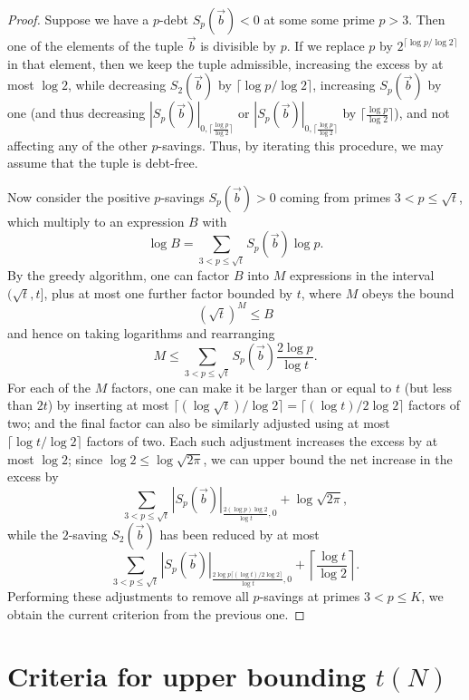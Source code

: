 \documentclass[12pt,a4paper,reqno]{amsart}
\numberwithin{equation}{section}
\theoremstyle{plain}
\theoremstyle{definition}
\begin{document}
\begin{proof} Suppose we have a $p$-debt $S_p(\vec b) < 0$ at some some prime $p>3$.  Then one of the elements of the tuple $\vec b$ is divisible by $p$.  If we replace $p$ by $2^{\lceil \log p/\log 2 \rceil}$ in that element, then we keep the tuple admissible, increasing the excess by at most $\log 2$, while decreasing $S_2(\vec b)$ by $\lceil \log p/\log 2 \rceil$, increasing $S_p(\vec b)$ by one (and thus decreasing $|S_p(\vec b)|_{0,\lceil \frac{\log p}{\log 2} \rceil}$ or $|S_p(\vec b)|_{0,\lceil \frac{\log p}{\log 2} \rceil}$ by $\lceil \frac{\log p}{\log 2} \rceil$), and not affecting any of the other $p$-savings.  Thus, by iterating this procedure, we may assume that the tuple is debt-free.

  Now consider the positive $p$-savings $S_p(\vec b)>0$ coming from primes $3 < p \leq \sqrt{t}$, which multiply to an expression $B$ with 
  $$\log B = \sum_{3 < p \leq \sqrt{t}} S_p(\vec b) \log p.$$
  By the greedy algorithm, one can factor $B$ into $M$ expressions in the interval $(\sqrt{t},t]$, plus at most one further factor bounded by $t$, where $M$ obeys the bound
  $$ \left(\sqrt{t}\right)^M \leq B$$
  and hence on taking logarithms and rearranging
  $$ M \leq \sum_{3 < p \leq \sqrt{t}} S_p(\vec b)  \frac{2 \log p}{\log t}.$$
For each of the $M$ factors, one can make it be larger than or equal to $t$ (but less than $2t$) by inserting at most $\lceil (\log \sqrt{t})/\log 2 \rceil = \lceil (\log t) / 2 \log 2 \rceil$ factors of two; and the final factor can also be similarly adjusted using at most $\lceil \log t/\log 2\rceil$ factors of two.  Each such adjustment increases the excess by at most $\log 2$; since $\log 2 \leq \log \sqrt{2\pi}$, we can upper bound the net increase in the excess by
$$ \sum_{3 < p \leq \sqrt{t}} |S_p(\vec b)|_{\frac{2 (\log p) \log 2}{\log t}, 0} + \log \sqrt{2\pi},$$
while the $2$-saving $S_2(\vec b)$ has been reduced by at most
$$ \sum_{3 < p \leq \sqrt{t}} |S_p(\vec b)|_{\frac{2 \log p \lceil (\log t)/2\log 2 \rceil}{\log t}, 0} + \left \lceil \frac{\log t}{\log 2} \right \rceil.$$
Performing these adjustments to remove all $p$-savings at primes $3 < p \leq K$, we obtain the current criterion from the previous one.
\end{proof}
  
  
\section{Criteria for upper bounding \texorpdfstring{$t(N)$}{t(N)}}
\end{document}
